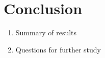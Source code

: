 \chapter{Conclusion}


\begin{enumerate}
	\item Summary of results
	\item Questions for further study
\end{enumerate}
